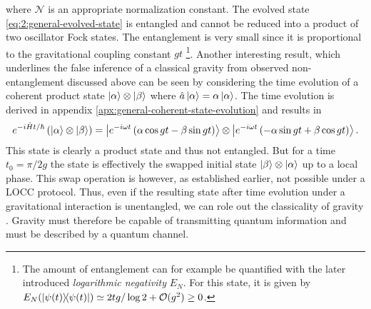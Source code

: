 where $\mathcal{N}$ is an appropriate normalization constant. The evolved state \eqref{eq:2:general-evolved-state} is entangled and cannot be reduced into a product of two oscillator Fock states. The entanglement is very small since it is proportional to the gravitational coupling constant $gt$ \footnote{The amount of entanglement can for example be quantified with the later introduced \textit{logarithmic negativity} $E_N$. For this state, it is given by $E_N(\ketbra{\psi(t)}) \simeq 2tg/\log 2 + \mathcal{O}(g^2) \geq 0$.}.
Another interesting result, which underlines the false inference of a classical gravity from observed non-entanglement discussed above can be seen by considering the time evolution of a coherent product state $\ket{\alpha} \otimes \ket{\beta}$ where $\hat{a}\ket{\alpha} = \alpha\ket{\alpha}$. The time evolution is derived in appendix \ref{apx:general-coherent-state-evolution} and results in
\begin{equation}
  e^{-i\hat{H}t/\hbar} \left( \ket{\alpha} \otimes \ket{\beta} \right) = \ket{ e^{-i\omega t} \left( \alpha \cos gt - \beta \sin gt \right) }\otimes\ket{ e^{-i\omega t} \left( - \alpha \sin gt + \beta \cos gt \right) } .
\end{equation}
This state is clearly a product state and thus not entangled. But for a time $t_0 = \pi/2g$ the state is effectively the swapped initial state $\ket{\beta} \otimes \ket{\alpha}$ up to a local phase. This swap operation is however, as established earlier, not possible under a LOCC protocol. Thus, even if the resulting state after time evolution under a gravitational interaction is unentangled, we can role out the classicality of gravity \cite{Carney_2018,Lami_2024}. 
Gravity must therefore be capable of transmitting quantum information and must be described by a quantum channel.

